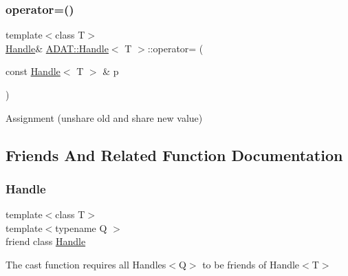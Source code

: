 \subsubsection{\texorpdfstring{operator=()}{operator=()}\hspace{0.1cm}{\footnotesize\ttfamily [2/2]}}
{\footnotesize\ttfamily template$<$class T$>$ \\
\mbox{\hyperlink{classADAT_1_1Handle}{Handle}}\& \mbox{\hyperlink{classADAT_1_1Handle}{A\+D\+A\+T\+::\+Handle}}$<$ T $>$\+::operator= (\begin{DoxyParamCaption}\item[{const \mbox{\hyperlink{classADAT_1_1Handle}{Handle}}$<$ T $>$ \&}]{p }\end{DoxyParamCaption})\hspace{0.3cm}{\ttfamily [inline]}}



Assignment (unshare old and share new value) 



\subsection{Friends And Related Function Documentation}
\mbox{\label{classADAT_1_1Handle_a67ca1a2d91273eaf85fb3d23ba8ce984}} 
\subsubsection{\texorpdfstring{Handle}{Handle}\hspace{0.1cm}{\footnotesize\ttfamily [1/2]}}
{\footnotesize\ttfamily template$<$class T$>$ \\
template$<$typename Q $>$ \\
friend class \mbox{\hyperlink{classADAT_1_1Handle}{Handle}}\hspace{0.3cm}{\ttfamily [friend]}}



The cast function requires all Handles$<$\+Q$>$ to be friends of Handle$<$\+T$>$ 

\mbox{\label{classADAT_1_1Handle_a7b22116ca951d48056220c7ad9620e85}} 
